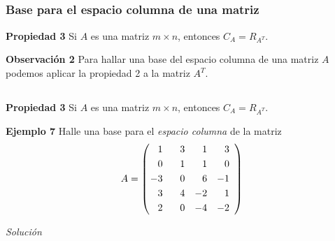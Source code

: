 
\subsection{}

\begin{frame}\frametitle{Base para el espacio columna de una matriz}
	
	\begin{prop}{\textbf{Propiedad 3}}
		\justifying
		Si $A$ es una matriz $m\times n$, entonces $C_A = R_{A^T}$.
	\end{prop}	
	
	
	\begin{alertblock}{\textbf{Observación 2}}
		Para hallar una base del espacio columna de una matriz $A$ podemos aplicar la propiedad 2 a la matriz $A^T$.
	\end{alertblock}
	
	
	
\end{frame}


\subsection{}

\begin{frame}%

\begin{prop}{\textbf{Propiedad 3}}
	\justifying
	Si $A$ es una matriz $m\times n$, entonces $C_A = R_{A^T}$.
\end{prop}	


\begin{ej}{\textbf{Ejemplo  7}}
	Halle una base para el \textit{espacio columna} de la matriz
	\[
	A = 
	\left( 
	\begin{array}{@{\hspace{0.1\tabcolsep}}rrrr}	
	 1 & \phantom{-}3 & 1 &  3 \\[1mm] 
	 0 & 1 & 1 &  0 \\[1mm] 
	-3 & 0 & 6 & -1 \\[1mm] 
	 3 & 4 & -2 & 1 \\[1mm] 
	 2 & 0 & -4 & -2
	\end{array} 
	\right)
	\]
\end{ej}
\textit{Solución}

\end{frame}

